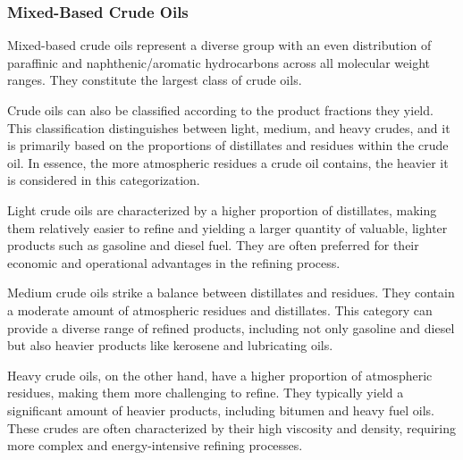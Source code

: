 \subsubsection{Mixed-Based Crude Oils}
Mixed-based crude oils represent a diverse group with an even distribution of paraffinic and naphthenic/aromatic hydrocarbons across all molecular weight ranges.
They constitute the largest class of crude oils.

Crude oils can also be classified according to the product fractions they yield.
This classification distinguishes between light, medium, and heavy crudes, and it is primarily based on the proportions of distillates and residues within the crude oil.
In essence, the more atmospheric residues a crude oil contains, the heavier it is considered in this categorization.

Light crude oils are characterized by a higher proportion of distillates, making them relatively easier to refine and yielding a larger quantity of valuable, lighter products such as gasoline and diesel fuel.
They are often preferred for their economic and operational advantages in the refining process.

Medium crude oils strike a balance between distillates and residues.
They contain a moderate amount of atmospheric residues and distillates.
This category can provide a diverse range of refined products, including not only gasoline and diesel but also heavier products like kerosene and lubricating oils.

Heavy crude oils, on the other hand, have a higher proportion of atmospheric residues, making them more challenging to refine.
They typically yield a significant amount of heavier products, including bitumen and heavy fuel oils.
These crudes are often characterized by their high viscosity and density, requiring more complex and energy-intensive refining processes.